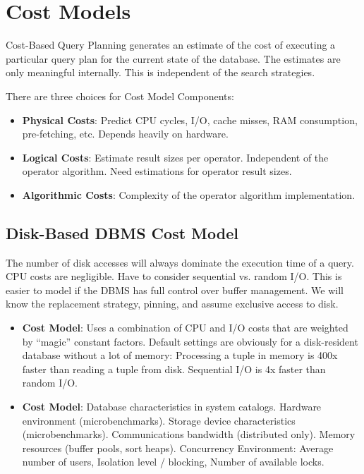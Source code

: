 \documentclass[11pt]{article}
\begin{document}
\maketitle
\thispagestyle{plain}

\section{Cost Models}
Cost-Based Query Planning generates an estimate of the cost of executing a particular query plan for the current state of the database. The estimates are only meaningful internally. This is independent of the search strategies.

There are three choices for Cost Model Components:
\begin{itemize}
	\item \textbf{Physical Costs}:
	Predict CPU cycles, I/O, cache misses, RAM consumption, pre-fetching, etc.
	Depends heavily on hardware.
	
	\item \textbf{Logical Costs}:
	Estimate result sizes per operator.
	Independent of the operator algorithm.
	Need estimations for operator result sizes.
	
	\item \textbf{Algorithmic Costs}:
	Complexity of the operator algorithm implementation.
\end{itemize}

\subsection*{Disk-Based DBMS Cost Model}
The number of disk accesses will always dominate the execution time of a query. CPU costs are negligible. Have to consider sequential vs. random I/O. This is easier to model if the DBMS has full control over buffer management. We will know the replacement strategy, pinning, and assume exclusive access to disk.

\begin{itemize}
	\item \textbf{ Cost Model}: 
	Uses a combination of CPU and I/O costs that are weighted by “magic” constant factors. Default settings are obviously for a disk-resident database without a lot of memory: Processing a tuple in memory is 400x faster than reading a tuple from disk. Sequential I/O is 4x faster than random I/O.
	
	\item \textbf{ Cost Model}: 
	Database characteristics in system catalogs. Hardware environment (microbenchmarks). Storage device characteristics (microbenchmarks). Communications bandwidth (distributed only). Memory resources (buffer pools, sort heaps). Concurrency Environment: Average number of users, Isolation level / blocking, Number of available locks.
\end{itemize}
\end{document}
